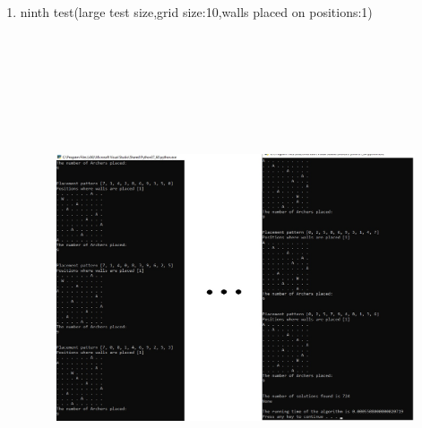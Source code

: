 \documentclass{article}
\begin{document}
\begin{enumerate}
\newpage
\item ninth test(large test size,grid size:10,walls placed on positions:1)
\begin{figure}[h]
\includegraphics[width=12 cm, height=15cm]{test9}
\end{figure}


\end{enumerate}
\end{document}
